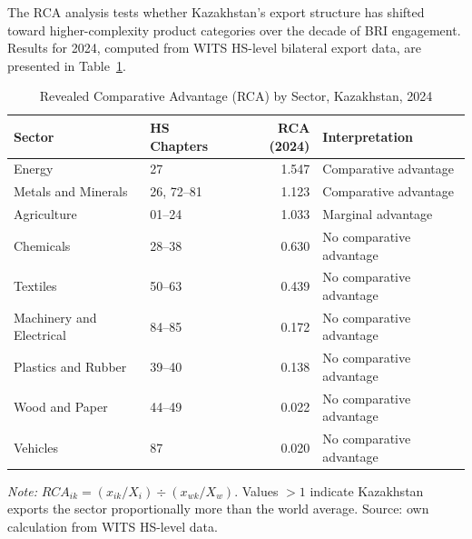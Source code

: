 \documentclass[12pt]{article}
\begin{document}
The RCA analysis tests whether Kazakhstan's export structure has shifted toward higher-complexity product categories over the decade of BRI engagement. Results for 2024, computed from WITS HS-level bilateral export data, are presented in Table~\ref{tab:rca_results}.

\begin{table}[H]
\centering
\small
\caption{Revealed Comparative Advantage (RCA) by Sector, Kazakhstan, 2024}
\label{tab:rca_results}
\begin{tabular}{llrl}
\toprule
Sector & HS Chapters & RCA (2024) & Interpretation \\
\midrule
Energy                  & 27          & 1.547 & Comparative advantage \\
Metals and Minerals     & 26, 72--81  & 1.123 & Comparative advantage \\
Agriculture             & 01--24      & 1.033 & Marginal advantage \\
Chemicals               & 28--38      & 0.630 & No comparative advantage \\
Textiles                & 50--63      & 0.439 & No comparative advantage \\
Machinery and Electrical& 84--85      & 0.172 & No comparative advantage \\
Plastics and Rubber     & 39--40      & 0.138 & No comparative advantage \\
Wood and Paper          & 44--49      & 0.022 & No comparative advantage \\
Vehicles                & 87          & 0.020 & No comparative advantage \\
\bottomrule
\end{tabular}
\footnotesize

\emph{Note:} $RCA_{ik} = (x_{ik}/X_i) \div (x_{wk}/X_w)$. Values $> 1$ indicate Kazakhstan exports the sector proportionally more than the world average. Source: own calculation from WITS HS-level data.
\end{table}
\end{document}
